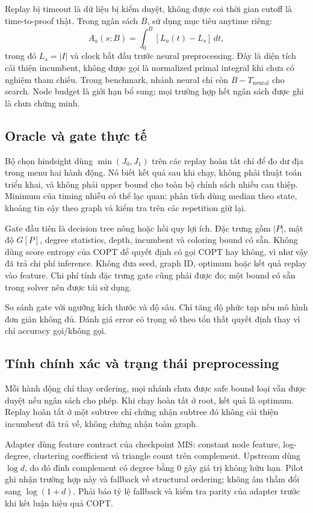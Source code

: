 \documentclass[11pt,a4paper]{article}
\begin{document}
Replay bị timeout là dữ liệu bị kiểm duyệt, không được coi thời gian cutoff là time-to-proof thật. Trong ngân sách $B$, sử dụng mục tiêu anytime riêng:
\begin{equation}
A_a(s;B)=\int_0^B [L_a(t)-L_s]\,dt,
\end{equation}
trong đó $L_s=|I|$ và clock bắt đầu trước neural preprocessing. Đây là diện tích cải thiện incumbent, không được gọi là normalized primal integral khi chưa có nghiệm tham chiếu. Trong benchmark, nhánh neural chỉ còn $B-T_{\mathrm{neural}}$ cho search. Node budget là giới hạn bổ sung; mọi trường hợp hết ngân sách được ghi là chưa chứng minh.

\subsection{Oracle và gate thực tế}
Bộ chọn hindsight dùng $\min(J_0,J_1)$ trên các replay hoàn tất chỉ để đo dư địa trong menu hai hành động. Nó biết kết quả sau khi chạy, không phải thuật toán triển khai, và không phải upper bound cho toàn bộ chính sách nhiều can thiệp. Minimum của timing nhiễu có thể lạc quan; phân tích dùng median theo state, khoảng tin cậy theo graph và kiểm tra trên các repetition giữ lại.

Gate đầu tiên là decision tree nông hoặc hồi quy lợi ích. Đặc trưng gồm $|P|$, mật độ $G[P]$, degree statistics, depth, incumbent và coloring bound có sẵn. Không dùng score entropy của COPT để quyết định có gọi COPT hay không, vì như vậy đã trả chi phí inference. Không đưa seed, graph ID, optimum hoặc kết quả replay vào feature. Chi phí tính đặc trưng gate cũng phải được đo; một bound có sẵn trong solver nên được tái sử dụng.

So sánh gate với ngưỡng kích thước và độ sâu. Chỉ tăng độ phức tạp nếu mô hình đơn giản không đủ. Đánh giá error có trọng số theo tổn thất quyết định thay vì chỉ accuracy gọi/không gọi.

\subsection{Tính chính xác và trạng thái preprocessing}
Mỗi hành động chỉ thay ordering, mọi nhánh chưa được safe bound loại vẫn được duyệt nếu ngân sách cho phép. Khi chạy hoàn tất ở root, kết quả là optimum. Replay hoàn tất ở một subtree chỉ chứng nhận subtree đó không cải thiện incumbent đã trả về, không chứng nhận toàn graph.

Adapter dùng feature contract của checkpoint MIS: constant node feature, log-degree, clustering coefficient và triangle count trên complement. Upstream dùng $\log d$, do đó đỉnh complement có degree bằng 0 gây giá trị không hữu hạn. Pilot ghi nhận trường hợp này và fallback về structural ordering; không âm thầm đổi sang $\log(1+d)$. Phải báo tỷ lệ fallback và kiểm tra parity của adapter trước khi kết luận hiệu quả COPT.
\end{document}
